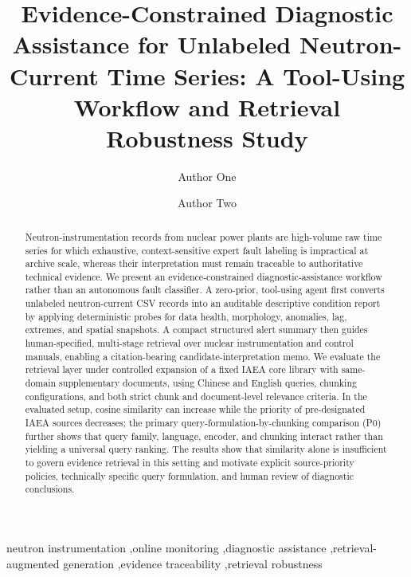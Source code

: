 \documentclass[final,5p,numbers]{elsarticle}
\begin{document}
\begin{frontmatter}

\title{Evidence-Constrained Diagnostic Assistance for Unlabeled Neutron-Current Time Series: A Tool-Using Workflow and Retrieval Robustness Study}

\author[addr1]{Author One}
\author[addr1]{Author Two}
\address[addr1]{Affiliation, City, Country}

\begin{abstract}
Neutron-instrumentation records from nuclear power plants are high-volume raw time series for which exhaustive, context-sensitive expert fault labeling is impractical at archive scale, whereas their interpretation must remain traceable to authoritative technical evidence. We present an evidence-constrained diagnostic-assistance workflow rather than an autonomous fault classifier. A zero-prior, tool-using agent first converts unlabeled neutron-current CSV records into an auditable descriptive condition report by applying deterministic probes for data health, morphology, anomalies, lag, extremes, and spatial snapshots. A compact structured alert summary then guides human-specified, multi-stage retrieval over nuclear instrumentation and control manuals, enabling a citation-bearing candidate-interpretation memo. We evaluate the retrieval layer under controlled expansion of a fixed IAEA core library with same-domain supplementary documents, using Chinese and English queries, chunking configurations, and both strict chunk and document-level relevance criteria. In the evaluated setup, cosine similarity can increase while the priority of pre-designated IAEA sources decreases; the primary query-formulation-by-chunking comparison (P0) further shows that query family, language, encoder, and chunking interact rather than yielding a universal query ranking. The results show that similarity alone is insufficient to govern evidence retrieval in this setting and motivate explicit source-priority policies, technically specific query formulation, and human review of diagnostic conclusions.
\end{abstract}

\begin{keyword}
neutron instrumentation \sep online monitoring \sep diagnostic assistance \sep retrieval-augmented generation \sep evidence traceability \sep retrieval robustness
\end{keyword}
\end{frontmatter}
\end{document}
